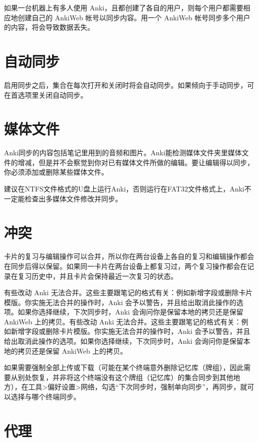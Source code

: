 \documentclass[a4paper]{book}
\begin{document}
		
		\begin{shaded}
			如果一台机器上有多人使用 Anki，且都创建了各自的用户，则每个用户都需要相应地创建自己的 AnkiWeb 帐号以同步内容。用一个 AnkiWeb 帐号同步多个用户的内容，将会导致数据丢失。
		\end{shaded}
		
		\section{自动同步}
		启用同步之后，集合在每次打开和关闭时将会自动同步。如果倾向于手动同步，可在首选项里关闭自动同步。
		\section{媒体文件}
		Anki同步的内容包括笔记里用到的音频和图片。Anki能检测媒体文件夹里媒体文件的增减，但是并不会察觉到你对已有媒体文件所做的编辑。要让编辑得以同步，你必须添加或删除某些媒体文件。
		
		
		\begin{shaded}
			建议在NTFS文件格式的U盘上运行Anki，否则运行在FAT32文件格式上，Anki不一定能检查出多媒体文件修改并同步。
		\end{shaded}
		
		\section{冲突}
		卡片的复习与编辑操作可以合并，所以你在两台设备上各自的复习和编辑操作都会在同步后得以保留。如果同一卡片在两台设备上都复习过，两个复习操作都会在记录在复习历史中，并且卡片会保持最近一次复习的状态。
		
		有些改动 Anki 无法合并。这些主要跟笔记的格式有关：例如新增字段或删除卡片模版。你实施无法合并的操作时，Anki 会予以警告，并且给出取消此操作的选项。如果你选择继续，下次同步时，Anki 会询问你是保留本地的拷贝还是保留 AnkiWeb 上的拷贝。有些改动 Anki 无法合并。这些主要跟笔记的格式有关：例如新增字段或删除卡片模版。你实施无法合并的操作时，Anki 会予以警告，并且给出取消此操作的选项。如果你选择继续，下次同步时，Anki 会询问你是保留本地的拷贝还是保留 AnkiWeb 上的拷贝。
		
		如果需要强制全部上传或下载（可能在某个终端意外删除记忆库（牌组），因此需要从别处恢复，并非将这个终端没有这个牌组（记忆库）的集合同步到其他地方），在工具>偏好设置>网络，勾选“下次同步时，强制单向同步”，再同步，就可以选择与哪个终端同步。
		
		\section{代理}
		
\end{document}
